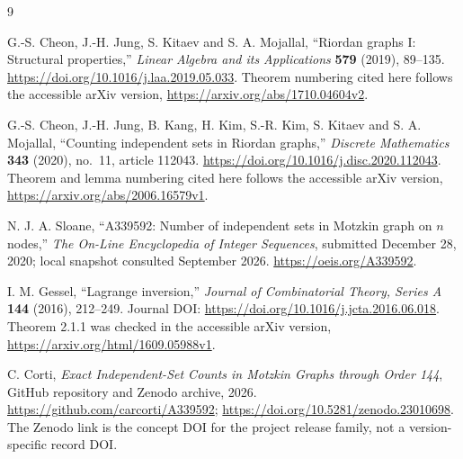 \documentclass[11pt,a4paper]{article}
\begin{document}
\clearpage
\begin{thebibliography}{9}
\sloppy\raggedright
{}
G.-S. Cheon, J.-H. Jung, S. Kitaev and S. A. Mojallal,
``Riordan graphs I: Structural properties,''
\emph{Linear Algebra and its Applications} \textbf{579} (2019), 89--135.
\url{https://doi.org/10.1016/j.laa.2019.05.033}.
Theorem numbering cited here follows the accessible arXiv version,
\url{https://arxiv.org/abs/1710.04604v2}.

G.-S. Cheon, J.-H. Jung, B. Kang, H. Kim, S.-R. Kim,
S. Kitaev and S. A. Mojallal,
``Counting independent sets in Riordan graphs,''
\emph{Discrete Mathematics} \textbf{343} (2020), no.~11, article 112043.
\url{https://doi.org/10.1016/j.disc.2020.112043}.
Theorem and lemma numbering cited here follows the accessible arXiv version,
\url{https://arxiv.org/abs/2006.16579v1}.

N. J. A. Sloane, ``A339592: Number of independent sets in Motzkin graph
on $n$ nodes,'' \emph{The On-Line Encyclopedia of Integer Sequences},
submitted December 28, 2020; local snapshot consulted September 2026.
\url{https://oeis.org/A339592}.

I. M. Gessel, ``Lagrange inversion,'' \emph{Journal of Combinatorial
Theory, Series A} \textbf{144} (2016), 212--249.
Journal DOI: \url{https://doi.org/10.1016/j.jcta.2016.06.018}.
Theorem 2.1.1 was checked in the accessible arXiv version,
\url{https://arxiv.org/html/1609.05988v1}.

C. Corti, \emph{Exact Independent-Set Counts in Motzkin Graphs through
Order 144}, GitHub repository and Zenodo archive, 2026.
\url{https://github.com/carcorti/A339592};
\url{https://doi.org/10.5281/zenodo.23010698}.
The Zenodo link is the concept DOI for the project release family, not a
version-specific record DOI.
\end{thebibliography}
\end{document}
